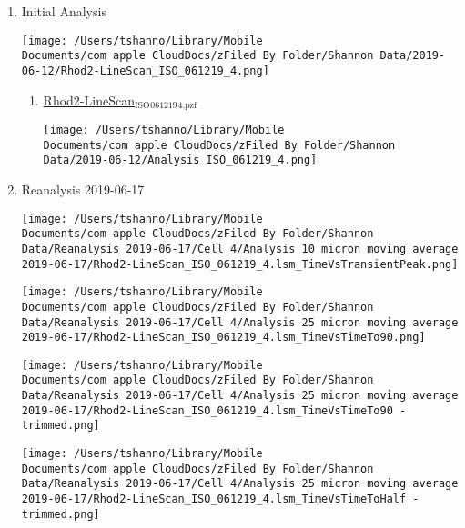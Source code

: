\documentclass[11pt]{article}
\begin{document}
\begin{enumerate}
\begin{enumerate}
\begin{enumerate}
\item Initial Analysis
\label{sec:org578308d}
\begin{center}
\texttt{[image: /Users/tshanno/Library/Mobile Documents/com~apple~CloudDocs/zFiled By Folder/Shannon Data/2019-06-12/Rhod2-LineScan\_ISO\_061219\_4.png]}
\end{center}
\begin{enumerate}
\item \href{file:///Users/tshanno/Library/Mobile Documents/com\~apple\~CloudDocs/zFiled By Folder/Shannon Data/2019-06-12/Rhod2-LineScan\_ISO\_061219\_4.pzf}{Rhod2-LineScan\(_{\text{ISO}}\)\(_{\text{061219}}\)\(_{\text{4.pzf}}\)}
\label{sec:orgf1a088b}
\begin{center}
\texttt{[image: /Users/tshanno/Library/Mobile Documents/com~apple~CloudDocs/zFiled By Folder/Shannon Data/2019-06-12/Analysis ISO\_061219\_4.png]}
\end{center}
\end{enumerate}
\item Reanalysis 2019-06-17
\label{sec:org209c7b6}
\begin{center}
\texttt{[image: /Users/tshanno/Library/Mobile Documents/com~apple~CloudDocs/zFiled By Folder/Shannon Data/Reanalysis 2019-06-17/Cell 4/Analysis 10 micron moving average 2019-06-17/Rhod2-LineScan\_ISO\_061219\_4.lsm\_TimeVsTransientPeak.png]}
\end{center}
\begin{center}
\texttt{[image: /Users/tshanno/Library/Mobile Documents/com~apple~CloudDocs/zFiled By Folder/Shannon Data/Reanalysis 2019-06-17/Cell 4/Analysis 25 micron moving average 2019-06-17/Rhod2-LineScan\_ISO\_061219\_4.lsm\_TimeVsTimeTo90.png]}
\end{center}
\begin{center}
\texttt{[image: /Users/tshanno/Library/Mobile Documents/com~apple~CloudDocs/zFiled By Folder/Shannon Data/Reanalysis 2019-06-17/Cell 4/Analysis 25 micron moving average 2019-06-17/Rhod2-LineScan\_ISO\_061219\_4.lsm\_TimeVsTimeTo90 - trimmed.png]}
\end{center}
\begin{center}
\texttt{[image: /Users/tshanno/Library/Mobile Documents/com~apple~CloudDocs/zFiled By Folder/Shannon Data/Reanalysis 2019-06-17/Cell 4/Analysis 25 micron moving average 2019-06-17/Rhod2-LineScan\_ISO\_061219\_4.lsm\_TimeVsTimeToHalf - trimmed.png]}
\end{center}

\end{enumerate}
\end{enumerate}
\end{enumerate}
\end{document}
